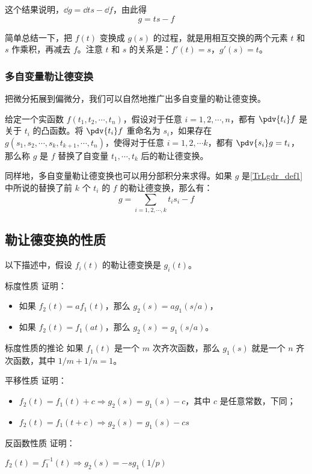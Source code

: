 这个结果说明，$\dd{g}=\dd{ts}-\dd{f}$，由此得
\begin{equation}
g=ts-f
\end{equation}

简单总结一下，把 $f(t)$ 变换成 $g(s)$ 的过程，就是用相互交换的两个元素 $t$ 和 $s$ 作乘积，再减去 $f$。注意 $t$ 和 $s$ 的关系是：$f'(t)=s$，$g'(s)=t$。

\subsubsection{多自变量勒让德变换}

把微分拓展到偏微分，我们可以自然地推广出多自变量的勒让德变换。

\begin{definition}{}\label{TrLgdr_def1}
给定一个实函数 $f(t_1, t_2, \cdots, t_n)$，假设对于任意 $i=1, 2, \cdots, n$，都有 $\pdv{t_i}f$ 是关于 $t_i$ 的凸函数。将 $\pdv{t_i}f$ 重命名为 $s_i$，如果存在 $g(s_1, s_2, \cdots, s_k, t_{k+1},\cdots, t_n)$，使得对于任意 $i=1,2,\cdots k$，都有 $\pdv{s_i}g=t_i$，那么称 $g$ 是 $f$ 替换了自变量 $t_1, \cdots, t_k$ 后的勒让德变换。
\end{definition}

同样地，多自变量勒让德变换也可以用分部积分来求得。如果 $g$ 是\autoref{TrLgdr_def1} 中所说的替换了前 $k$ 个 $t_i$ 的 $f$ 的勒让德变换，那么有：\begin{equation}\label{TrLgdr_eq1}
g=\sum\limits_{i=1,2,\cdots, k}t_is_i-f
\end{equation}

\subsection{勒让德变换的性质}

以下描述中，假设 $f_i(t)$ 的勒让德变换是 $g_i(t)$。

\begin{exercise}{标度性质}
证明：
\begin{itemize}
\item 如果 $f_2(t)=af_1(t)$，那么 $g_2(s)=ag_1(s/a)$，
\item 如果 $f_2(t)=f_1(at)$，那么 $g_2(s)=g_1(s/a)$。
\end{itemize}
\end{exercise}

\begin{corollary}{标度性质的推论}
如果 $f_1(t)$ 是一个 $m$ 次齐次函数，那么 $g_1(s)$ 就是一个 $n$ 齐次函数，其中 $1/m+1/n=1$。
\end{corollary}

\begin{exercise}{平移性质}
证明：
\begin{itemize}
\item $f_2(t)=f_1(t)+c\Rightarrow g_2(s)=g_1(s)-c$，其中 $c$ 是任意常数，下同；
\item $f_2(t)=f_1(t+c)\Rightarrow g_2(s)=g_1(s)-cs$
\end{itemize}
\end{exercise}

\begin{exercise}{反函数性质}
证明：

$f_2(t)=f_1^{-1}(t)\Rightarrow g_2(s)=-sg_1(1/p)$
\end{exercise}








